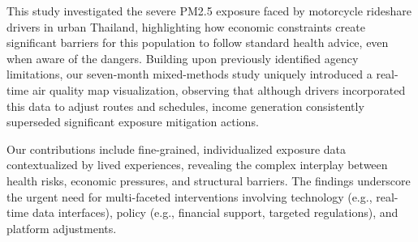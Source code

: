 \documentclass[sigconf,screen,natbib=true]{acmart}
\begin{document}
This study investigated the severe PM2.5 exposure faced by motorcycle rideshare drivers in urban Thailand, 
highlighting how economic constraints create significant barriers for this population to follow standard health advice, even when aware of the dangers.
Building upon previously identified agency limitations, our seven-month mixed-methods study uniquely introduced a real-time air quality map visualization,
observing that although drivers incorporated this data to adjust routes and schedules,
income generation consistently superseded significant exposure mitigation actions.


Our contributions include fine-grained, individualized exposure data contextualized by lived experiences, revealing the complex interplay between health risks, economic pressures, and structural barriers.
The findings underscore the urgent need for multi-faceted interventions involving technology (e.g., real-time data interfaces), policy (e.g., financial support, targeted regulations), and platform adjustments.
%



\end{document}
